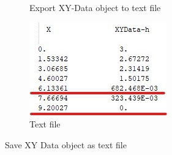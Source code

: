 \begin{itemize}
\begin{figure}[!h]
\begin{subfigure}[!h]{0.33\textwidth}
       \caption{Export XY-Data object to text file}
       \label{post36}
     \end{subfigure}%
     \begin{subfigure}[!h]{0.33\textwidth}
       \includegraphics[width=\textwidth]{./body/images/29c.jpg}
       \caption{Text file}
       \label{post37}
     \end{subfigure}%
     \caption{Save XY Data object as text file}
   \end{figure}


\end{itemize}
